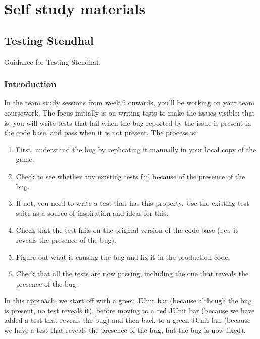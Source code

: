 \documentclass[
]{book}
\providecommand{\tightlist}{%
  \setlength{\itemsep}{0pt}\setlength{\parskip}{0pt}}
\begin{document}
\hypertarget{part-self-study-materials}{%
\part{Self study materials}\label{part-self-study-materials}}

\hypertarget{guiding}{%
\chapter{Testing Stendhal}\label{guiding}}

Guidance for Testing Stendhal.

\hypertarget{intros}{%
\section{Introduction}\label{intros}}

In the team study sessions from week 2 onwards, you'll be working on your team coursework. The focus initially is on writing tests to make the issues visible: that is, you will write tests that fail when the bug reported by the issue is present in the code base, and pass when it is not present. The process is:

\begin{enumerate}
\def\labelenumi{\arabic{enumi}.}
\tightlist
\item
  First, understand the bug by replicating it manually in your local copy of the game.
\item
  Check to see whether any existing tests fail because of the presence of the bug.
\item
  If not, you need to write a test that has this property. Use the existing test suite as a source of inspiration and ideas for this.
\item
  Check that the test fails on the original version of the code base (i.e., it reveals the presence of the bug).
\item
  Figure out what is causing the bug and fix it in the production code.
\item
  Check that all the tests are now passing, including the one that reveals the presence of the bug.
\end{enumerate}

In this approach, we start off with a green JUnit bar (because although the bug is present, no test reveals it), before moving to a red JUnit bar (because we have added a test that reveals the bug) and then back to a green JUnit bar (because we have a test that reveals the presence of the bug, but the bug is now fixed).
\end{document}
